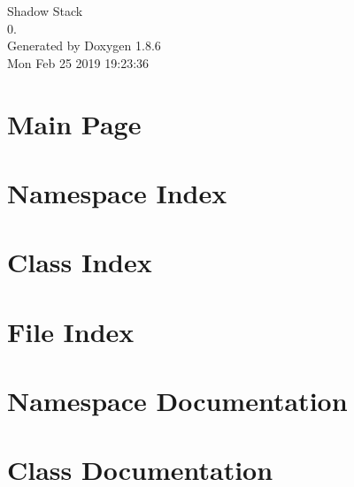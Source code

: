 \documentclass[twoside]{book}
\newcommand{\clearemptydoublepage}{%
  \newpage{\pagestyle{empty}\cleardoublepage}%
}
\begin{document}
\hypersetup{pageanchor=false}
\begin{titlepage}
\vspace*{7cm}
\begin{center}%
{\Large Shadow Stack \\[1ex]\large 0. }\\
\vspace*{1cm}
{\large Generated by Doxygen 1.8.6}\\
\vspace*{0.5cm}
{\small Mon Feb 25 2019 19:23:36}\\
\end{center}
\end{titlepage}
\clearemptydoublepage
\tableofcontents
\clearemptydoublepage
{}
\hypersetup{pageanchor=true}

\chapter{Main Page}
\label{index}\hypertarget{index}{}
\chapter{Namespace Index}

\chapter{Class Index}

\chapter{File Index}

\chapter{Namespace Documentation}



\chapter{Class Documentation}





















\end{document}
